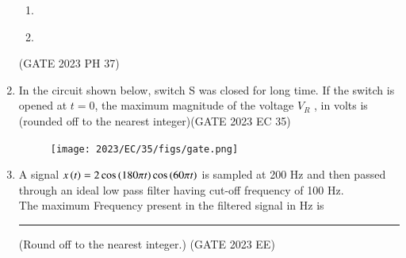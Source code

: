 \begin{enumerate}[label=\thechapter.\arabic*,ref=\thechapter.\theenumi]
\begin{enumerate}[label = (\alph*)]
    \item 
    \begin{figure}[!h]
        \centering
        \resizebox{0.2\textwidth}{!}{}
        \label{optC_gate.ph.23.37}
    \end{figure}

    \item 
    \begin{figure}[!h]
        \centering
        \resizebox{0.2\textwidth}{!}{}
        \label{optD_gate.ph.23.37}
    \end{figure}
\end{enumerate} \hfill(GATE 2023 PH 37)
\solution

\pagebreak
\pagebreak

\item In the circuit shown below, switch S was closed for long time. If the switch is opened at $t=0$, the  maximum magnitude of the voltage $V_R$ , in volts is (rounded off to the nearest integer)\hfill{(GATE 2023 EC 35)}\\
\begin{figure}[h!]
    \centering
    \texttt{[image: 2023/EC/35/figs/gate.png]}
    \caption{ }
\end{figure}
\solution
\pagebreak
\item A signal $x\left(t\right)=2\cos{(180\pi t)}\cos{(60\pi t)}$ is sampled at 200 Hz and then passed through an ideal low pass filter having cut-off frequency of 100 Hz.\\
The maximum Frequency present in the filtered  signal in Hz is \rule{1cm}{0.5mm} (Round off to the nearest integer.) \hfill (GATE 2023 EE)
\solution
\pagebreak
\end{enumerate}
